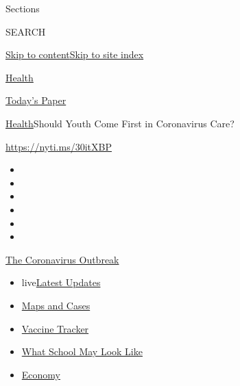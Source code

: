 Sections

SEARCH

\protect\hyperlink{site-content}{Skip to
content}\protect\hyperlink{site-index}{Skip to site index}

\href{https://www.nytimes3xbfgragh.onion/section/health}{Health}

\href{https://myaccount.nytimes3xbfgragh.onion/auth/login?response_type=cookie\&client_id=vi}{}

\href{https://www.nytimes3xbfgragh.onion/section/todayspaper}{Today's
Paper}

\href{/section/health}{Health}\textbar{}Should Youth Come First in
Coronavirus Care?

\url{https://nyti.ms/30itXBP}

\begin{itemize}
\item
\item
\item
\item
\item
\item
\end{itemize}

\href{https://www.nytimes3xbfgragh.onion/news-event/coronavirus?action=click\&pgtype=Article\&state=default\&region=TOP_BANNER\&context=storylines_menu}{The
Coronavirus Outbreak}

\begin{itemize}
\tightlist
\item
  live\href{https://www.nytimes3xbfgragh.onion/2020/08/01/world/coronavirus-covid-19.html?action=click\&pgtype=Article\&state=default\&region=TOP_BANNER\&context=storylines_menu}{Latest
  Updates}
\item
  \href{https://www.nytimes3xbfgragh.onion/interactive/2020/us/coronavirus-us-cases.html?action=click\&pgtype=Article\&state=default\&region=TOP_BANNER\&context=storylines_menu}{Maps
  and Cases}
\item
  \href{https://www.nytimes3xbfgragh.onion/interactive/2020/science/coronavirus-vaccine-tracker.html?action=click\&pgtype=Article\&state=default\&region=TOP_BANNER\&context=storylines_menu}{Vaccine
  Tracker}
\item
  \href{https://www.nytimes3xbfgragh.onion/interactive/2020/07/29/us/schools-reopening-coronavirus.html?action=click\&pgtype=Article\&state=default\&region=TOP_BANNER\&context=storylines_menu}{What
  School May Look Like}
\item
  \href{https://www.nytimes3xbfgragh.onion/live/2020/07/31/business/stock-market-today-coronavirus?action=click\&pgtype=Article\&state=default\&region=TOP_BANNER\&context=storylines_menu}{Economy}
\end{itemize}

